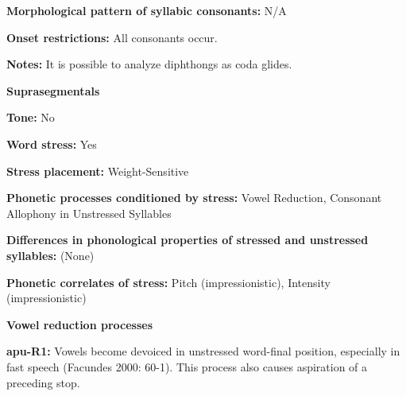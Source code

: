\begin{styleBody}
\textbf{Morphological pattern of syllabic consonants:} N/A
\end{styleBody}

\begin{styleBody}
\textbf{Onset restrictions:} All consonants occur.
\end{styleBody}

\begin{styleBody}
\textbf{Notes:} It is possible to analyze diphthongs as coda glides.
\end{styleBody}

\begin{styleBody}
\textbf{Suprasegmentals}
\end{styleBody}

\begin{styleBody}
\textbf{Tone:} No
\end{styleBody}

\begin{styleBody}
\textbf{Word stress:} Yes
\end{styleBody}

\begin{styleBody}
\textbf{Stress placement:} Weight-Sensitive
\end{styleBody}

\begin{styleBody}
\textbf{Phonetic processes conditioned by stress:} Vowel Reduction, Consonant Allophony in Unstressed Syllables
\end{styleBody}

\begin{styleBody}
\textbf{Differences in phonological properties of stressed and unstressed syllables:} (None)
\end{styleBody}

\begin{styleBody}
\textbf{Phonetic correlates of stress: }Pitch (impressionistic), Intensity (impressionistic)
\end{styleBody}

\begin{styleBody}
\textbf{Vowel reduction processes}
\end{styleBody}

\begin{styleBody}
\textbf{apu-R1:} Vowels become devoiced in unstressed word-final position, especially in fast speech (Facundes 2000: 60-1). This process also causes aspiration of a preceding stop.
\end{styleBody}


